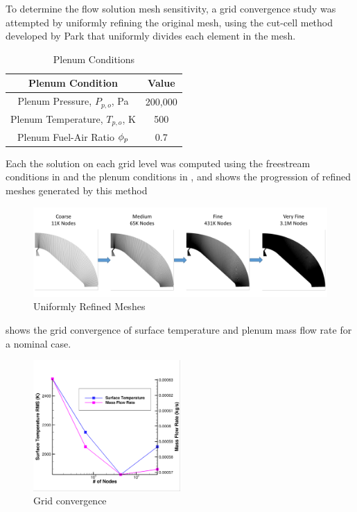 To determine the flow solution mesh sensitivity, a grid convergence study was
attempted by uniformly refining the original mesh, using the cut-cell method
developed by Park\cite{???} that uniformly divides each element in the mesh.
\begin{table}[h]
  \centering
  \begin{tabular}{c|c}
    Plenum Condition & Value \\
    \hline
    Plenum Pressure, $P_{p,o}$, Pa   & 200,000 \\
    Plenum Temperature, $T_{p,o}$, K &  500 \\
    Plenum Fuel-Air Ratio $\phi_p$      &  0.7
  \end{tabular}
  \caption{Plenum Conditions}
  \label{tab:plenum-conditions}
\end{table}
Each the solution on each grid level was computed using the freestream
conditions in  and the plenum conditions in
, and  shows the progression
of refined meshes generated by this method
\begin{figure}[h]
  \centering
  \includegraphics[width=\textwidth]{figures/mesh-progression.png}
  \caption{Uniformly Refined Meshes}
  \label{fig:mesh-refined}
\end{figure}
 shows the grid convergence of surface temperature
and plenum mass flow rate for a nominal case.
\begin{figure}[!h]
  \centering
  \includegraphics[width=0.5\textwidth]{figures/t-m-conv.png}
  \caption{Grid convergence }
  \label{fig:grid-convergence}
\end{figure}
